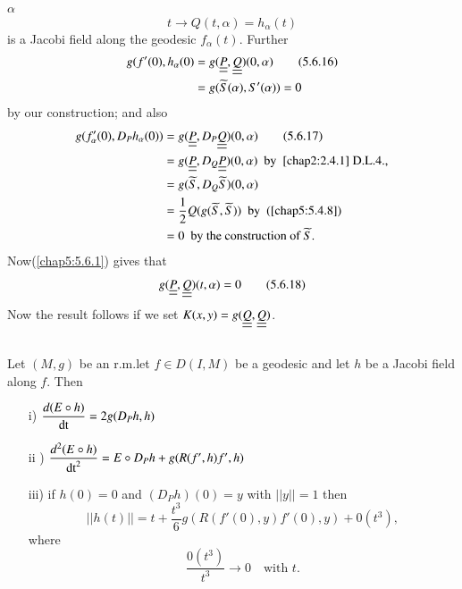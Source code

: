 $\alpha$
\begin{equation*}
t\to Q(t,\alpha)=h_{\alpha}(t)\tag{5.6.15}\label{chap5:5.6.15}
\end{equation*}
is a Jacobi field along the geodesic $f_{\alpha}(t)$. Further
\begin{align*}
g(f'(0), h_{\alpha}(0) &=
g(\underline{\underline{P}},\underline{\underline{Q}})(0,\alpha)\tag{5.6.16}\label{chap5:5.6.16}\\
&= g(\widetilde{S}(\alpha), S'(\alpha))=0
\end{align*}
by our construction; and also
\begin{align*}
g(f'_{\alpha}(0), D_{P}h_{\alpha}(0)) &=
g(\underline{\underline{P}},D_{P}\underline{\underline{Q}})(0,\alpha)\tag{5.6.17}\label{chap5:5.6.17}\\
&= g(\underline{\underline{P}},D_{Q}\underline{\underline{P}})(0,\alpha)\text{ \  by \ \ref{chap2:2.4.1}
  D.L.4.,}\\
&= g(\widetilde{S},D_{Q}\widetilde{S})(0,\alpha)\\
&=\frac{1}{2}Q(g(\widetilde{S},\widetilde{S}))\text{ \ by
  \ (\ref{chap5:5.4.8})}\\
&= 0\text{ \  by the construction of } \widetilde{S}. 
\end{align*}
Now\pageoriginale (\ref{chap5:5.6.1}) gives that
\begin{equation*}
g(\underline{\underline{P}},\underline{\underline{Q}})(t,\alpha)=0 \tag{5.6.18}\label{chap5:5.6.18}
\end{equation*}
Now the result follows if we set $K(x,y)=g(\underline{\underline{Q}},\underline{\underline{Q}})$.

\setcounter{subsection}{18}

\subsection{}\label{chap5:5.6.19}

\begin{prop*}
Let $(M,g)$ be an r.m.\@ let $f\in D(I,M)$ be a geodesic and let $h$
be a Jacobi field along $f$. Then
\begin{itemize}
\item[\rm i)] $\dfrac{d(E\circ h)}{\operatorname{dt}}=2g(D_{P}h,h)$

\item[\rm ii]) $\dfrac{d^{2}(E\circ h)}{\operatorname{dt}^{2}}=E\circ
  D_{P}h+g(R(f',h)f',h)$

\item[\rm iii)] if $h(0)=0$ and $(D_{P}h)(0)=y$ with $||y||=1$ then
$$
||h(t)||=t+\dfrac{t^{3}}{6}g(R(f'(0),y)f'(0), y)+0(t^{3}),
$$
where
$$
\dfrac{0(t^{3})}{t^{3}}\to 0\quad\text{with \ }t.
$$
\end{itemize}
\end{prop*}

